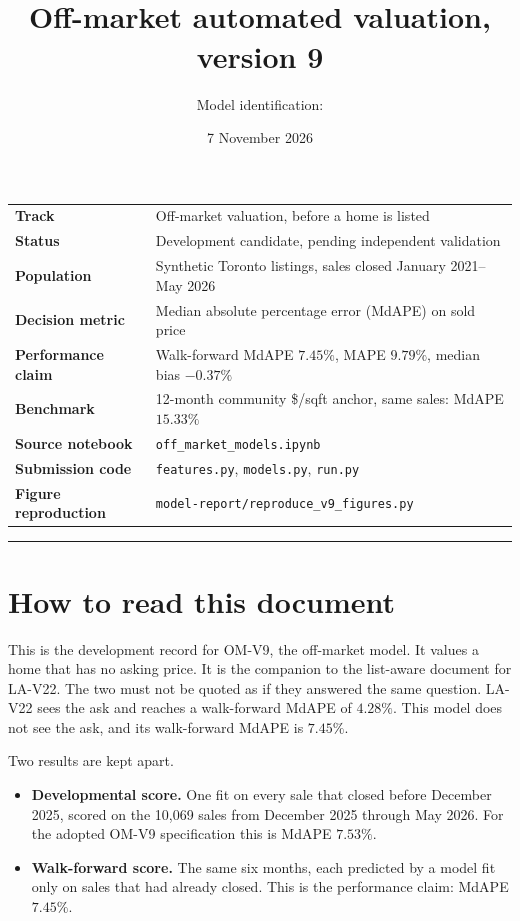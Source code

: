 \documentclass[11pt]{article}
\title{\textcolor{navy}{\doctype}\\[4pt]
\large Off-market automated valuation, version 9}
\author{Model identification: \modelid}
\date{7 November 2026}
\newcommand{\modelid}{OM-V9}
\begin{document}
\maketitle
\thispagestyle{empty}

\begin{center}
\small
\begin{tabular}{@{}>{\bfseries}l p{11.2cm}@{}}
Track & Off-market valuation, before a home is listed \\
Status & Development candidate, pending independent validation \\
Population & Synthetic Toronto listings, sales closed January 2021--May 2026 \\
Decision metric & Median absolute percentage error (MdAPE) on sold price \\
Performance claim & Walk-forward MdAPE \(7.45\%\), MAPE \(9.79\%\), median bias \(-0.37\%\) \\
Benchmark & 12-month community \$/sqft anchor, same sales: MdAPE \(15.33\%\) \\
Source notebook & \texttt{off\_market\_models.ipynb} \\
Submission code & \texttt{features.py}, \texttt{models.py}, \texttt{run.py} \\
Figure reproduction & \texttt{model-report/reproduce\_v9\_figures.py} \\
\end{tabular}
\end{center}

\vspace{4pt}
{\color{rule}\hrule}
\vspace{8pt}

\section*{How to read this document}

This is the development record for \modelid, the off-market model. It values a home that has no asking price. It is the companion to the list-aware document for LA-V22. The two must not be quoted as if they answered the same question. LA-V22 sees the ask and reaches a walk-forward MdAPE of \(4.28\%\). This model does not see the ask, and its walk-forward MdAPE is \(7.45\%\).

Two results are kept apart.

\begin{itemize}
\item \textbf{Developmental score.} One fit on every sale that closed before December 2025, scored on the 10,069 sales from December 2025 through May 2026. For the adopted \modelid{} specification this is MdAPE \(7.53\%\).
\item \textbf{Walk-forward score.} The same six months, each predicted by a model fit only on sales that had already closed. This is the performance claim: MdAPE \(7.45\%\).
\end{itemize}
\end{document}
